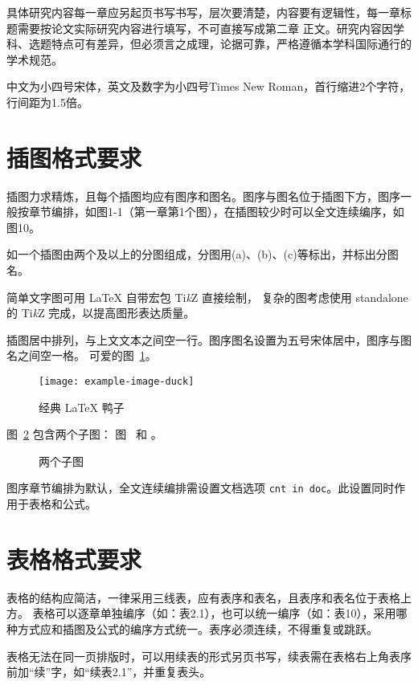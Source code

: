 具体研究内容每一章应另起页书写书写，层次要清楚，内容要有逻辑性，每一章标题需要按论文实际研究内容进行填写，不可直接写成第二章 正文。研究内容因学科、选题特点可有差异，但必须言之成理，论据可靠，严格遵循本学科国际通行的学术规范。

中文为小四号宋体，英文及数字为小四号Times New Roman，首行缩进2个字符，行间距为1.5倍。

\section{插图格式要求}

  插图力求精炼，且每个插图均应有图序和图名。图序与图名位于插图下方，图序一般按章节编排，如图1-1（第一章第1个图），在插图较少时可以全文连续编序，如图10。
  
  如一个插图由两个及以上的分图组成，分图用(a)、(b)、(c)等标出，并标出分图名。

  简单文字图可用 \LaTeX{} 自带宏包 Ti\textit{k}Z 直接绘制，
  复杂的图考虑使用 standalone 的 Ti\textit{k}Z 完成，以提高图形表达质量。

  插图居中排列，与上文文本之间空一行。图序图名设置为五号宋体居中，图序与图名之间空一格。
  可爱的图~\ref{fig:duck}。
  \begin{figure}[htbp]
    \texttt{[image: example-image-duck]}
    \caption{经典 \LaTeX{} 鸭子}
    \label{fig:duck}
  \end{figure}

  图~\ref{fig:subfigs} 包含两个子图：
  图~ 和 。
  \begin{figure}[htbp]
    \quad
    \caption{两个子图}
    \label{fig:subfigs}
  \end{figure}

  图序章节编排为默认，全文连续编排需设置文档选项 \texttt{cnt in doc}。此设置同时作用于表格和公式。

\section{表格格式要求}

  表格的结构应简洁，一律采用三线表，应有表序和表名，且表序和表名位于表格上方。
  表格可以逐章单独编序（如：表2.1），也可以统一编序（如：表10），采用哪种方式应和插图及公式的编序方式统一。表序必须连续，不得重复或跳跃。

  表格无法在同一页排版时，可以用续表的形式另页书写，续表需在表格右上角表序前加“续”字，如“续表2.1”，并重复表头。

